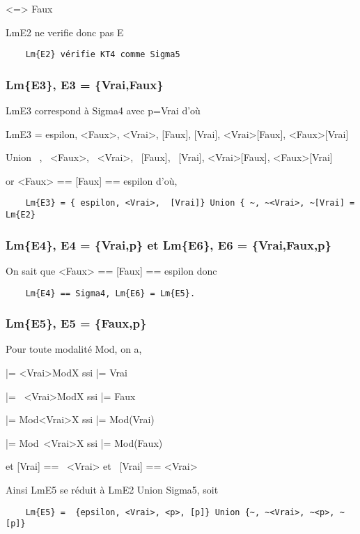 \documentclass[a4paper,10pt]{article}
\begin{document}
        <=> Faux
        
	Lm{E2} ne verifie donc pas E
	
\begin{lstlisting}
	Lm{E2} vérifie KT4 comme Sigma5
\end{lstlisting}
   
   \subsubsection{Lm\{E3\}, E3 = \{Vrai,Faux\}}
     
Lm{E3} correspond à Sigma4 avec p=Vrai d'où

	Lm{E3} = { espilon, <Faux>, <Vrai>, [Faux], [Vrai], <Vrai>[Faux], <Faux>[Vrai] } 
	
	Union { ~, ~<Faux>, ~<Vrai>, ~[Faux], ~[Vrai], <Vrai>[Faux], <Faux>[Vrai] }
	
	or <Faux> == [Faux] == espilon d'où,
	\begin{lstlisting}
	Lm{E3} = { espilon, <Vrai>,  [Vrai]} Union { ~, ~<Vrai>, ~[Vrai] = Lm{E2}
	\end{lstlisting}
	
	
   \subsubsection{Lm\{E4\}, E4 = \{Vrai,p\} et Lm\{E6\}, E6 = \{Vrai,Faux,p\}}
     
   On sait que <Faux> == [Faux] == espilon
	donc 
	\begin{lstlisting}
	Lm{E4} == Sigma4, Lm{E6} = Lm{E5}.
        \end{lstlisting}
        
        
   \subsubsection{Lm\{E5\}, E5 = \{Faux,p\}}
     
	
	Pour toute modalité Mod, on a,
	
	|= <Vrai>ModX ssi |= Vrai 

	|= ~<Vrai>ModX ssi |= Faux

	|= Mod<Vrai>X ssi |= Mod(Vrai)

	|= Mod~<Vrai>X ssi |= Mod(Faux)
	
	et [Vrai] == ~<Vrai> et ~[Vrai] == <Vrai>
	
	Ainsi Lm{E5} se réduit à Lm{E2} Union Sigma5, soit
	\begin{lstlisting}
	Lm{E5} =  {epsilon, <Vrai>, <p>, [p]} Union {~, ~<Vrai>, ~<p>, ~[p]}
        \end{lstlisting}
	
\end{document}
